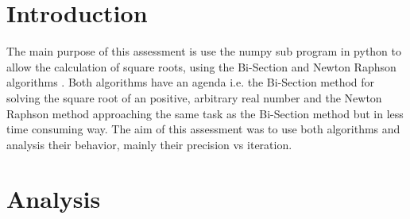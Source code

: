 \documentclass[12pt]{article}
\begin{document}

\newpage
\begin{titlepage}
\begin{tableofcontents}

\end{tableofcontents}
\end{titlepage}


\section{Introduction}

The main purpose of this assessment is use the numpy sub program in python to allow the calculation of square roots, using the Bi-Section and Newton Raphson algorithms \cite{Workshop_10}. Both algorithms have an agenda i.e. the Bi-Section method for solving the square root of an positive, arbitrary real number and the Newton Raphson method approaching the same task as the Bi-Section method but in less time consuming way.
The aim of this assessment was to use both algorithms and analysis their behavior, mainly their precision vs iteration. 


\section{Analysis}
\end{document}
